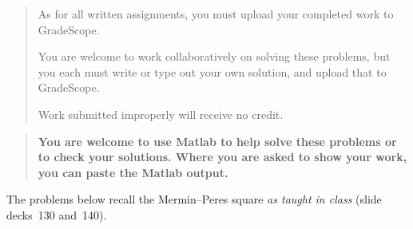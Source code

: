 \documentclass[12pt]{article}
\begin{document}

\begin{quote}
    As for all written assignments, you must upload your completed work to GradeScope.

    You are welcome to work collaboratively on solving these problems, but you each must write or type out your own solution, and upload that to GradeScope.

    Work submitted improperly will receive no credit.
\end{quote}

\begin{quote}\bf
You are welcome to use Matlab to help solve these problems or to check your solutions.  Where you are asked to show your work, you can paste the Matlab output.
\end{quote}

The problems below recall the Mermin--Peres square \emph{as taught in class} (slide decks~130 and~140).
\end{document}

